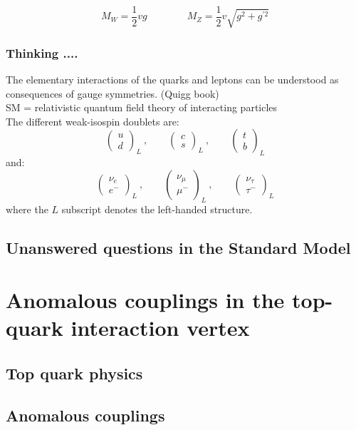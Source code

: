 \begin{equation}\label{eq::VectorBosonMasses}
 M_W = \frac{1}{2} v g \qquad \qquad M_Z = \frac{1}{2} v \sqrt{g^2 + g^{'2}}
\end{equation}



\subsubsection{Thinking ....}
The elementary interactions of the quarks and leptons can be understood as consequences of gauge symmetries. (Quigg book)\\
SM = relativistic quantum field theory of interacting particles\\

The different weak-isospin doublets are:
\begin{equation}
 \begin{pmatrix} u \\ d \end{pmatrix}_{L}~, \qquad \begin{pmatrix} c \\ s \end{pmatrix}_{L}~, \qquad \begin{pmatrix} t \\ b \end{pmatrix}_{L}
\end{equation}
and:
\begin{equation}
 \begin{pmatrix} \nu_{e} \\ e^{-} \end{pmatrix}_{L}~, \qquad \begin{pmatrix} \nu_{\mu} \\ \mu^{-} \end{pmatrix}_{L}~, \qquad \begin{pmatrix} \nu_{\tau} \\ \tau^{-} \end{pmatrix}_{L}
\end{equation}
where the $L$ subscript denotes the left-handed structure.

\subsection{Unanswered questions in the Standard Model} \label{sec::QuestionsSM}

\section{Anomalous couplings in the top-quark interaction vertex}

\subsection{Top quark physics}

\subsection{Anomalous couplings}